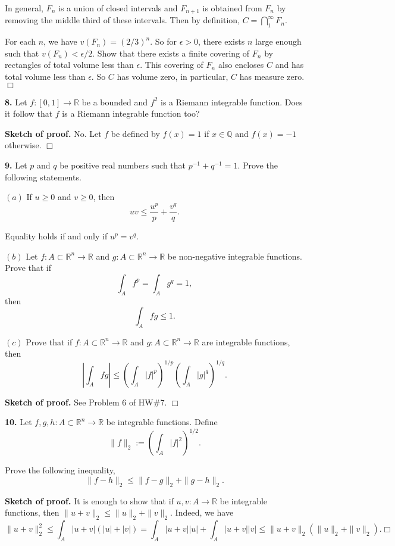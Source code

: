 \documentclass{article}
\begin{document}
In general, $F_n$ is a union of closed intervals and $F_{n+1}$ is
obtained from $F_n$ by removing the middle third of these intervals.
Then by definition, $C = \bigcap_{1}^{\infty} F_n$.

For each $n$, we have $v(F_n) = (2/3)^n$. So for $\epsilon > 0$, there
exists $n$ large enough such that $v(F_n) < \epsilon /2$. Show that
there exists a finite covering of $F_n$ by rectangles of total volume
less than $\epsilon$. This covering of $F_n$ also encloses $C$ and has
total volume less than $\epsilon$. So $C$ has volume zero, in
particular, $C$ has measure zero. $\Box$

    \textbf{8.} Let $f:[0,1]\to \mathbb{R}$ be a bounded and $f^2$ is a
Riemann integrable function. Does it follow that $f$ is a Riemann
integrable function too?

    \textbf{Sketch of proof.} No. Let $f$ be defined by $f(x) = 1$ if
$x \in \mathbb{Q}$ and $f(x) = -1$ otherwise. $\Box$

    \textbf{9.} Let $p$ and $q$ be positive real numbers such that
$p^{-1}+q^{-1} =1$. Prove the following statements.

$(a)$ If $u\ge 0$ and $v\ge 0$, then
\[uv \le \frac{u^p}{p} + \frac{v^q}{q}.\]

Equality holds if and only if $u^p = v^q$.

$(b)$ Let $f:A\subset \mathbb{R}^n \to \mathbb{R}$ and
$g:A\subset \mathbb{R}^n \to \mathbb{R}$ be non-negative integrable
functions. Prove that if \[\int_A f^p = \int_A g^q = 1,\] then
\[\int_A fg \le 1.\]

$(c)$ Prove that if $f:A \subset \mathbb{R}^n \to \mathbb{R}$ and
$g:A\subset \mathbb{R}^n \to \mathbb{R}$ are integrable functions, then
\[\left|\int_A fg\right| \le \left(\int_A |f|^p\right)^{1/p} \left(\int_A |g|^q\right)^{1/q}.\]

    \textbf{Sketch of proof.} See Problem 6 of HW\#7. $\Box$

    \textbf{10.} Let $f,g,h:A\subset \mathbb{R}^n \to \mathbb{R}$ be
integrable functions. Define
\[\|f\|_2 := \left(\int_A|f|^2\right)^{1/2}.\]

Prove the following inequality,
\[\|f-h\|_2 \le \|f-g\|_2 + \|g- h\|_2.\]

    \textbf{Sketch of proof.} It is enough to show that if
$u,v :A \to \mathbb{R}$ be integrable functions, then
$\|u + v\|_2 \le \|u\|_2 + \|v\|_2$. Indeed, we have
\[\|u+v\|_2^2 \le \int_A |u+v| (|u|+|v|)= \int_A|u+v||u| + \int_A |u+v||v|  \le  \|u+v\|_2(\|u\|_2 + \|v\|_2).\Box\]


    
    
    
    
\end{document}
